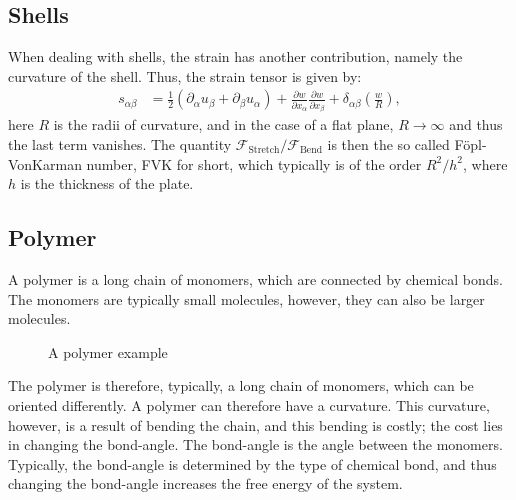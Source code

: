 \documentclass[a4paper]{article}
\newcommand{\f}{\mathcal{F}}
\begin{document}
\subsection{Shells}
When dealing with shells, the strain has another contribution, namely the curvature of the shell. Thus, the strain tensor is given by:
\begin{align*}
    s_{\alpha\beta} &= \frac{1}{2}\left(\partial_\alpha u_\beta + \partial_\beta u_\alpha\right) + \frac{\partial w}{\partial x_\alpha}\frac{\partial w}{\partial x_\beta} + \delta_{\alpha\beta}\left(\frac{w}{R}\right),
\end{align*}here $R$ is the radii of curvature, and in the case of a flat plane, $R \to\infty$ and thus the last term vanishes.
The quantity $\f_{\text{Stretch}}/\f_{\text{Bend}}$ is then the so called Föpl-VonKarman number, FVK for short, which typically is of the order $R^2/h^2$, where $h$ is the thickness of the plate.
\subsection{Polymer}
A polymer is a long chain of monomers, which are connected by chemical bonds. The monomers are typically small molecules, however, they can also be larger molecules.
\begin{figure}[H]
   \centering
   \caption{A polymer example}
   \label{fig: polymer example}
\end{figure}\noindent
The polymer is therefore, typically, a long chain of monomers, which can be oriented differently. A polymer can therefore have a curvature.
This curvature, however, is a result of bending the chain, and this bending is costly; the cost lies in changing the bond-angle. The bond-angle is the angle between the monomers.
Typically, the bond-angle is determined by the type of chemical bond, and thus changing the bond-angle increases the free energy of the system.
\end{document}
